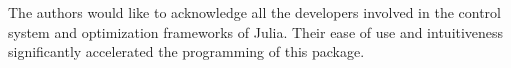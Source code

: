 \documentclass{ifacconf}
\begin{document}





\begin{ack}
The authors would like to acknowledge all the developers involved in the control system and optimization frameworks of Julia. Their ease of use and intuitiveness  significantly accelerated the programming of this package.
\end{ack}


\end{document}
